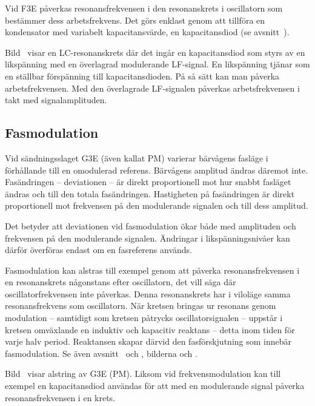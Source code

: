 Vid F3E påverkas resonansfrekvensen i den resonanskrets i oscillatorn som
bestämmer dess arbetsfrekvens.
Det görs enklast genom att tillföra en kondensator med variabelt
kapacitansvärde, en kapacitansdiod (se avsnitt~).


Bild~ visar en LC-resonanskrets där det ingår en
kapacitansdiod som styrs av en likspänning med en överlagrad modulerande LF-signal.
En likspänning tjänar som en ställbar förspänning till kapacitansdioden.
På så sätt kan man påverka arbetsfrekvensen.
Med den överlagrade LF-signalen påverkas arbetsfrekvensen i takt med
signalamplituden.

\subsection{Fasmodulation}

Vid sändningsslaget G3E (även kallat PM) varierar bärvågens fasläge i
förhållande till en omodulerad referens.
Bärvågens amplitud ändras däremot inte.
Fasändringen -- deviationen -- är direkt proportionell mot hur snabbt fasläget
ändras och till den totala fasändringen.
Hastigheten på fasändringen är direkt proportionell mot frekvensen på den
modulerande signalen och till dess amplitud.

Det betyder att deviationen vid fasmodulation ökar både med amplituden
och frekvensen på den modulerande signalen.
Ändringar i likspänningsnivåer kan därför överföras endast om en fasreferens
används.

Fasmodulation kan alstras till exempel genom att påverka resonansfrekvensen i
en resonanskrets någonstans efter oscillatorn, det vill säga där
oscillatorfrekvensen inte påverkas.
Denna resonanskrets har i viloläge samma resonansfrekvens som oscillatorn.
När kretsen bringas ur resonans genom modulation -- samtidigt som kretsen
påtrycks oscillatorsignalen -- uppstår i kretsen omväxlande en induktiv och
kapacitiv reaktans -- detta inom tiden för varje halv period.
Reaktansen skapar därvid den fasförskjutning som innebär fasmodulation.
Se även avsnitt~ och , bilderna
 och .


Bild~ visar alstring av G3E (PM).
Liksom vid frekvensmodulation kan till exempel en kapacitansdiod användas för
att med en modulerande signal påverka resonansfrekvensen i en krets.
